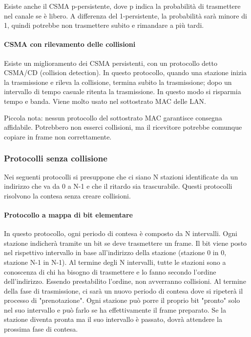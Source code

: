 Esiste anche il CSMA p-persistente, dove p indica la probabilità di trasmettere nel canale se è libero.
A differenza del 1-persistente, la probabilità sarà minore di 1, quindi potrebbe non trasmettere subito e rimandare a più tardi.

\paragraph{CSMA con rilevamento delle collisioni}
Esiste un miglioramento dei CSMA persistenti, con un protocollo detto CSMA/CD (collision detection).
In questo protocollo, quando una stazione inizia la trasmissione e rileva la collisione, termina subito la trasmissione;
dopo un intervallo di tempo casuale ritenta la trasmissione.
In questo modo si risparmia tempo e banda. Viene molto usato nel sottostrato MAC delle LAN.

Piccola nota: nessun protocollo del sottostrato MAC garantisce consegna affidabile.
Potrebbero non esserci collisioni, ma il ricevitore potrebbe comunque copiare in frame non correttamente.

\subsubsection{Protocolli senza collisione}
Nei seguenti protocolli si presuppone che ci siano N stazioni identificate da un indirizzo che va da 0 a N-1 e che il ritardo sia trascurabile.
Questi protocolli risolvono la contesa senza creare collisioni.

\paragraph{Protocollo a mappa di bit elementare}
In questo protocollo, ogni periodo di contesa è composto da N intervalli.
Ogni stazione indicherà tramite un bit se deve trasmettere un frame. 
Il bit viene posto nel rispettivo intervallo in base all'indirizzo della stazione (stazione 0 in 0, stazione N-1 in N-1).
Al termine degli N intervalli, tutte le stazioni sono a conoscenza di chi ha bisogno di trasmettere e lo fanno secondo l'ordine dell'indirizzo.
Essendo prestabilito l'ordine, non avverranno collisioni.
Al termine della fase di trasmissione, ci sarà un nuovo periodo di contesa dove si ripeterà il processo di "prenotazione".
Ogni stazione può porre il proprio bit "pronto" solo nel suo intervallo e può farlo se ha effettivamente il frame preparato.
Se la stazione diventa pronta ma il suo intervallo è passato, dovrà attendere la prossima fase di contesa.

